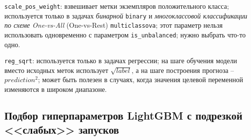 \documentclass[%
	11pt,
	a4paper,
	utf8,
		]{article}
\begin{document}
\verb|scale_pos_weight|: взвешивает метки экземпляров положительного класса; используется только в задачах \emph{бинарной} \verb|binary| и \emph{многоклассовой классификации по схеме One-vs-All} (One-vs-Rest) \verb|multiclassova|;  этот параметр нельзя использовать одновременно с параметром \verb|is_unbalanced|; нужно выбрать что-то одно.

\verb|reg_sqrt|: используется только в задачах регрессии; на шаге обучения модели вместо исходных меток использует $ \sqrt{label} $, а на шаге построения прогноза -- $ prediction^2 $; может быть полезен в случаях, когда значения целевой переменной изменяются в широком диапазоне.








\subsection{Подбор гиперпараметров LightGBM с подрезкой <<слабых>> запусков}
\end{document}

